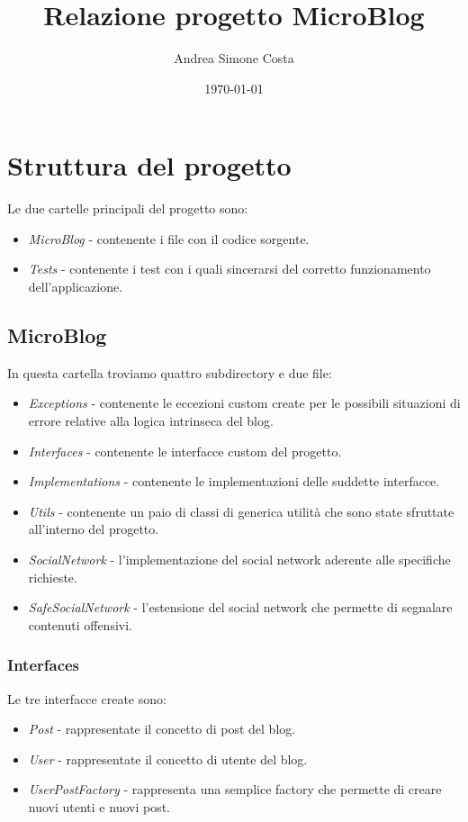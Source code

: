 \documentclass[a4paper,10pt]{book}
\title{Relazione progetto MicroBlog}
\author{Andrea Simone Costa}
\date{\today}
\begin{document}
\clearpage\maketitle
\thispagestyle{empty}


\newpage


\section*{Struttura del progetto}

Le due cartelle principali del progetto sono:

\begin{itemize}
    \item \emph{MicroBlog} - contenente i file con il codice sorgente.
    \item \emph{Tests} - contenente i test con i quali sincerarsi del corretto funzionamento dell'applicazione.
\end{itemize}

\subsection*{MicroBlog}

In questa cartella troviamo quattro subdirectory e due file:
\begin{itemize}
    \item \emph{Exceptions} - contenente le eccezioni custom create per le possibili situazioni di errore relative alla logica intrinseca del blog.
    \item \emph{Interfaces} - contenente le interfacce custom del progetto.
    \item \emph{Implementations} - contenente le implementazioni delle suddette interfacce.
    \item \emph{Utils} - contenente un paio di classi di generica utilità che sono state sfruttate all'interno del progetto.
    \item \emph{SocialNetwork} - l'implementazione del social network aderente alle specifiche richieste.
    \item \emph{SafeSocialNetwork} - l'estensione del social network che permette di segnalare contenuti offensivi.
\end{itemize}

\subsubsection*{Interfaces}
Le tre interfacce create sono:
\begin{itemize}
    \item \emph{Post} - rappresentate il concetto di post del blog.
    \item \emph{User} - rappresentate il concetto di utente del blog.
    \item \emph{UserPostFactory} - rappresenta una semplice factory che permette di creare nuovi utenti e nuovi post.
\end{itemize}
\end{document}
